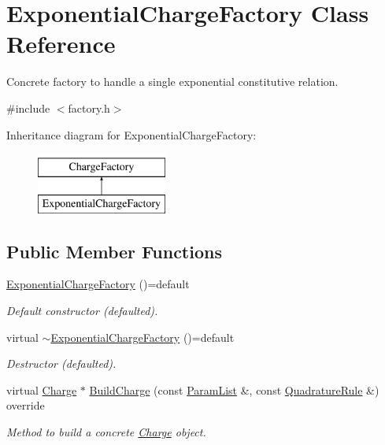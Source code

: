 \hypertarget{classExponentialChargeFactory}{\section{Exponential\-Charge\-Factory Class Reference}
\label{classExponentialChargeFactory}
}


Concrete factory to handle a single exponential constitutive relation.  




{\ttfamily \#include $<$factory.\-h$>$}

Inheritance diagram for Exponential\-Charge\-Factory\-:\begin{figure}[H]
\begin{center}
\leavevmode
\includegraphics[height=2.000000cm]{classExponentialChargeFactory}
\end{center}
\end{figure}
\subsection*{Public Member Functions}
\begin{DoxyCompactItemize}
\item 
\hypertarget{classExponentialChargeFactory_a857af7212bef3bc0691b90f82160ede0}{\hyperlink{classExponentialChargeFactory_a857af7212bef3bc0691b90f82160ede0}{Exponential\-Charge\-Factory} ()=default}\label{classExponentialChargeFactory_a857af7212bef3bc0691b90f82160ede0}

\begin{DoxyCompactList}\small\item\em Default constructor (defaulted). \end{DoxyCompactList}\item 
\hypertarget{classExponentialChargeFactory_a27be0c4dbe004a49db0065cd9e26bb04}{virtual \hyperlink{classExponentialChargeFactory_a27be0c4dbe004a49db0065cd9e26bb04}{$\sim$\-Exponential\-Charge\-Factory} ()=default}\label{classExponentialChargeFactory_a27be0c4dbe004a49db0065cd9e26bb04}

\begin{DoxyCompactList}\small\item\em Destructor (defaulted). \end{DoxyCompactList}\item 
virtual \hyperlink{classCharge}{Charge} $\ast$ \hyperlink{classExponentialChargeFactory_a1e1718ca16c1624e98865bc6359c2136}{Build\-Charge} (const \hyperlink{classParamList}{Param\-List} \&, const \hyperlink{classQuadratureRule}{Quadrature\-Rule} \&) override
\begin{DoxyCompactList}\small\item\em Method to build a concrete \hyperlink{classCharge}{Charge} object. \end{DoxyCompactList}\end{DoxyCompactItemize}


